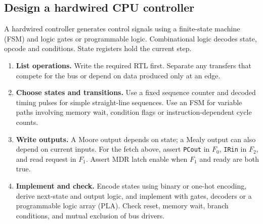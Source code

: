 \documentclass[12pt,a4paper]{article}
\begin{document}
\subsection{Design a hardwired CPU controller}
\begin{tcolorbox}[defbox,title={Hardwired control}]
A hardwired controller generates control signals using a finite-state machine (FSM) and logic gates or programmable logic. Combinational logic decodes state, opcode and conditions. State registers hold the current step.
\end{tcolorbox}

\begin{enumerate}[leftmargin=*,itemsep=3pt]
\item \textbf{List operations.} Write the required RTL first. Separate any transfers that compete for the bus or depend on data produced only at an edge.
\item \textbf{Choose states and transitions.} Use a fixed sequence counter and decoded timing pulses for simple straight-line sequences. Use an FSM for variable paths involving memory wait, condition flags or instruction-dependent cycle counts.
\item \textbf{Write outputs.} A Moore output depends on state; a Mealy output can also depend on current inputs. For the fetch above, assert \texttt{PCout} in $F_0$, \texttt{IRin} in $F_2$, and read request in $F_1$. Assert MDR latch enable when $F_1$ and ready are both true.
\item \textbf{Implement and check.} Encode states using binary or one-hot encoding, derive next-state and output logic, and implement with gates, decoders or a programmable logic array (PLA). Check reset, memory wait, branch conditions, and mutual exclusion of bus drivers.
\end{enumerate}
\begin{tcolorbox}[tikzbox,title={Hardwired control inputs, state and outputs},unbreakable]
\centering
{}
\end{tcolorbox}
\end{document}
